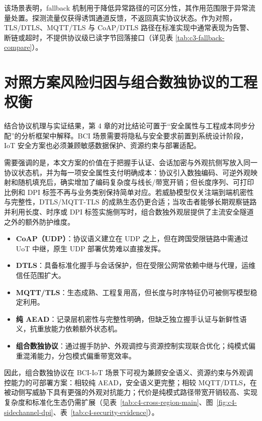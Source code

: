 该场景表明，fallback 机制用于降低异常路径的可区分性，其作用范围限于异常流量处置。探测流量仅获得诱饵通道反馈，不返回真实协议状态。作为对照，TLS/DTLS、MQTT/TLS 与 CoAP/DTLS 路径在标准实现中通常表现为告警、断链或超时，不提供协议级已读字节回落接口（详见表 \ref{tab:c3-fallback-compare}）\cite{rfc8446,rfc9147,mqtt311,rfc7252}。

\section{对照方案风险归因与组合数独协议的工程权衡}
结合协议机理与实证结果，第 4 章的对比结论可置于“安全属性与工程成本同步分配”的分析框架中解释。BCI 场景需要将隐私与安全要求前置到系统设计阶段\cite{kapitonova2022framework}，IoT 安全方案也必须兼顾敏感数据保护、资源约束与部署适配\cite{trabelsi2023iotaccess}。

需要强调的是，本文方案的价值在于把握手认证、会话加密与外观抗侧写放入同一协议状态机，并为每一项安全属性支付明确成本：协议引入数独编码、可逆外观映射和随机填充后，确实增加了编码复杂度与线长/带宽开销；但长度序列、可打印比例和 DPI 标签不再与业务类别保持简单对应。若威胁模型仅关注端到端机密性与完整性，DTLS/MQTT-TLS 的成熟生态仍更合适；当攻击者能够长期观察链路并利用长度、时序或 DPI 标签实施侧写时，组合数独外观层提供了主流安全隧道之外的额外防护维度。

\begin{itemize}
  \item \textbf{CoAP（UDP）}：协议语义建立在 UDP 之上\cite{rfc7252}，但在跨国受限链路中需通过 UoT 中继，原生 UDP 部署优势难以直接发挥。
  \item \textbf{DTLS}：具备标准化握手与会话保护\cite{rfc9147}，但在受限公网常依赖中继与代理，运维信任范围扩大。
  \item \textbf{MQTT/TLS}：生态成熟、工程复用高\cite{mqtt311,rfc8446,zheng2023mqtttamarin}，但长度与时序特征仍可被侧写模型稳定利用\cite{alwhbi2024encrypted,hou2024encmalware}。
  \item \textbf{纯 AEAD}：记录层机密性与完整性明确\cite{rfc5116}，但缺乏独立握手认证与新鲜性语义，抗重放能力依赖额外状态机。
  \item \textbf{组合数独协议}：通过握手防护、外观调控与资源控制实现联合优化；纯模式偏重混淆能力，分包模式偏重带宽效率。
\end{itemize}

因此，组合数独协议在 BCI-IoT 场景下可视为兼顾安全语义、资源约束与外观调控能力的可部署方案：相较纯 AEAD，安全语义更完整；相较 MQTT/DTLS，在被动侧写威胁下具有更强的外观对抗能力；代价是纯模式路径带宽开销较高、实现复杂度和标准化生态仍需扩展（见表~\ref{tab:c4-cross-region-main}、图~\ref{fig:c4-sidechannel-dpi}、表~\ref{tab:c4-security-evidence}）。

